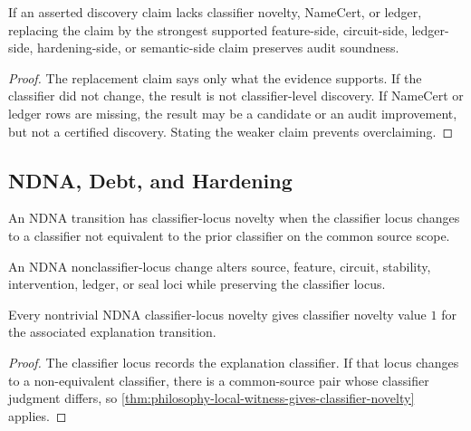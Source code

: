 \begin{theorem}
\label{thm:philosophy-claim-demotion-preserves-audit-soundness}
If an asserted discovery claim lacks classifier novelty, NameCert, or
ledger, replacing the claim by the strongest supported feature-side,
circuit-side, ledger-side, hardening-side, or semantic-side claim
preserves audit soundness.
\end{theorem}
\begin{proof}
The replacement claim says only what the evidence supports. If the
classifier did not change, the result is not classifier-level discovery.
If NameCert or ledger rows are missing, the result may be a candidate or
an audit improvement, but not a certified discovery. Stating the weaker
claim prevents overclaiming.
\end{proof}

\subsection{NDNA, Debt, and Hardening}
\label{subsec:philosophy-ndna-debt-hardening-classifier-novelty}

\begin{definition}
\label{def:philosophy-ndna-classifier-locus-novelty}
An NDNA transition has classifier-locus novelty when the classifier locus
changes to a classifier not equivalent to the prior classifier on the
common source scope.
\end{definition}

\begin{definition}
\label{def:philosophy-ndna-nonclassifier-locus-change}
An NDNA nonclassifier-locus change alters source, feature, circuit,
stability, intervention, ledger, or seal loci while preserving the
classifier locus.
\end{definition}

\begin{theorem}
\label{thm:philosophy-ndna-classifier-locus-gives-interpretability-novelty}
Every nontrivial NDNA classifier-locus novelty gives classifier novelty
value $1$ for the associated explanation transition.
\end{theorem}
\begin{proof}
The classifier locus records the explanation classifier. If that locus
changes to a non-equivalent classifier, there is a common-source pair
whose classifier judgment differs, so
\autoref{thm:philosophy-local-witness-gives-classifier-novelty}
applies.
\end{proof}

